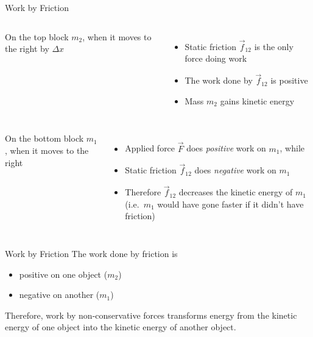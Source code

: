 \documentclass[12pt,compress,aspectratio=169]{beamer}
\begin{document}
\begin{frame}{Work by Friction}
  \begin{columns}
    \centering

    On the top block $m_2$, when it moves to the right by $\Delta x$
    \begin{itemize}
    \item Static friction $\vec f_{12}$ is the only force doing work
    \item The work done by $\vec f_{12}$ is positive
    \item Mass $m_2$ gains kinetic energy
    \end{itemize}
  \end{columns}
  \begin{columns}
    On the bottom block $m_1$, when it moves to the right
    \begin{itemize}
    \item Applied force $\vec F$ does \emph{positive} work on $m_1$, while
    \item Static friction $\vec f_{12}$ does \emph{negative} work on $m_1$
    \item Therefore $\vec f_{12}$ decreases the kinetic energy of $m_1$ (i.e.\
      $m_1$ would have gone faster if it didn't have friction)
    \end{itemize}
    
    \centering
  \end{columns}
\end{frame}



\begin{frame}{Work by Friction}
  The work done by friction is
  \begin{itemize}
  \item positive on one object ($m_2$)
  \item negative on another ($m_1$)
  \end{itemize}
  Therefore, work by non-conservative forces transforms energy from the kinetic
  energy of one object into the kinetic energy of another object.
\end{frame}
\end{document}

